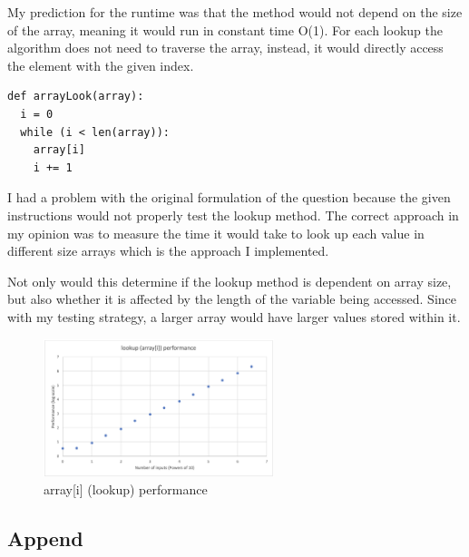 \documentclass[12pt]{article}
\begin{document}
My prediction for the runtime was that the method would not depend on the size of the array, meaning it would run in constant time O(1). For each lookup the algorithm does not need to traverse the array, instead, it would directly access the element with the given index.

\footnotesize
\begin{verbatim}
def arrayLook(array):
  i = 0
  while (i < len(array)): 
    array[i]
    i += 1
\end{verbatim}
\normalsize

I had a problem with the original formulation of the question because the given instructions would not properly test the lookup method. The correct approach in my opinion was to measure the time it would take to look up each value in different size arrays which is the approach I implemented. 

Not only would this determine if the lookup method is dependent on array size, but also whether it is affected by the length of the variable being accessed. Since with my testing strategy, a larger array would have larger values stored within it.

\begin{figure}[H]
\centering
\includegraphics[width=0.6\textwidth,height=\textheight,keepaspectratio]{lookupgraph.png}
\caption{array[i] (lookup) performance}
\label{Figure: lookupgraph}
\end{figure}

\subsection{Append}
\end{document}
